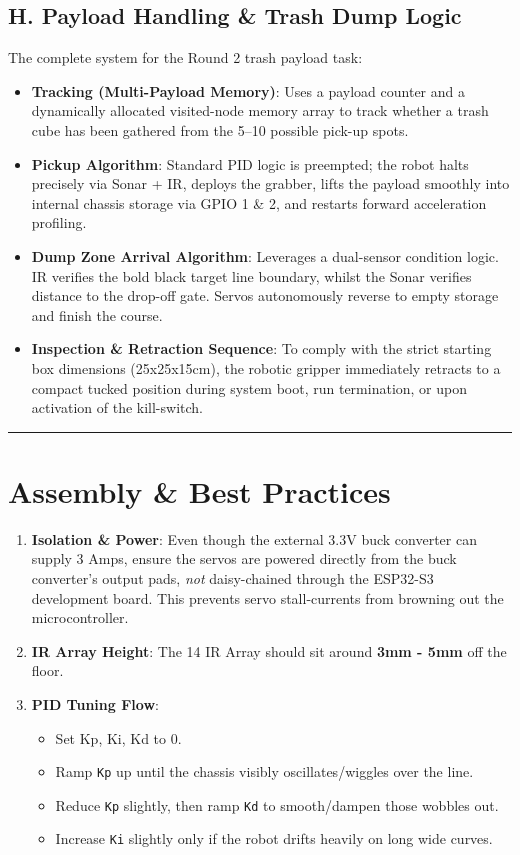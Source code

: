 \documentclass[12pt,a4paper]{article}
\begin{document}
\subsection*{H. Payload Handling \& Trash Dump Logic}
The complete system for the Round 2 trash payload task:
\begin{itemize}
    \item \textbf{Tracking (Multi-Payload Memory)}: Uses a payload counter and a dynamically allocated visited-node memory array to track whether a trash cube has been gathered from the 5--10 possible pick-up spots.
    \item \textbf{Pickup Algorithm}: Standard PID logic is preempted; the robot halts precisely via Sonar + IR, deploys the grabber, lifts the payload smoothly into internal chassis storage via GPIO 1 \& 2, and restarts forward acceleration profiling.
    \item \textbf{Dump Zone Arrival Algorithm}: Leverages a dual-sensor condition logic. IR verifies the bold black target line boundary, whilst the Sonar verifies distance to the drop-off gate. Servos autonomously reverse to empty storage and finish the course.
    \item \textbf{Inspection \& Retraction Sequence}: To comply with the strict starting box dimensions (25x25x15cm), the robotic gripper immediately retracts to a compact tucked position during system boot, run termination, or upon activation of the kill-switch.
\end{itemize}

\vspace{1em}
\hrule
\vspace{1em}

\section{Assembly \& Best Practices}

\begin{enumerate}
    \item \textbf{Isolation \& Power}: Even though the external 3.3V buck converter can supply 3 Amps, ensure the servos are powered directly from the buck converter's output pads, \textit{not} daisy-chained through the ESP32-S3 development board. This prevents servo stall-currents from browning out the microcontroller.
    \item \textbf{IR Array Height}: The 14 IR Array should sit around \textbf{3mm - 5mm} off the floor. 
    \item \textbf{PID Tuning Flow}:
    \begin{itemize}
        \item Set Kp, Ki, Kd to 0.
        \item Ramp \lstinline|Kp| up until the chassis visibly oscillates/wiggles over the line.
        \item Reduce \lstinline|Kp| slightly, then ramp \lstinline|Kd| to smooth/dampen those wobbles out.
        \item Increase \lstinline|Ki| slightly only if the robot drifts heavily on long wide curves.
    \end{itemize}
\end{enumerate}
\end{document}
